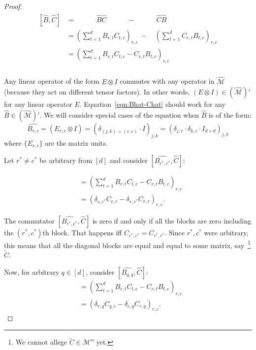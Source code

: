 \begin{proof}
    \begin{align}
        \begin{split}
        \label{eqn:Bhat-Chat}
            [\widehat{B}, \widehat{C}] &= \quad\quad\quad\widehat{B} \widehat{C} \quad\quad\quad -  \quad\quad\quad\widehat{C} \widehat{B} \quad\quad\quad \\
        &= \left(\sum\limits_{t = 1}^d B_{r, t} C_{t,c}\right)_{r,c}  \ - \quad \left(\sum\limits_{t = 1}^d C_{r, t} B_{t,c} \right)_{r,c}\\
        &= \left(\sum\limits_{t = 1}^d B_{r, t} C_{t,c} - C_{r, t} B_{t,c}\right)_{r,c}\\
        \end{split}
    \end{align}

Any linear operator of the form $E \otimes I$ commutes with any operator in $\widehat{\mathcal{M}}$ (because they act on different tensor factors). In other words, $(E \otimes I) \in (\widehat{\mathcal{M}})'$ for any linear operator $E$. Equation~\ref{eqn:Bhat-Chat} should work for any $\widehat{B} \in (\widehat{\mathcal{M}})'$. We will consider special cases of the equation when $\widehat{B}$ is of the form:
\begin{equation}
    \widehat{B_{r,c}} = \left(E_{r,c} \otimes I\right) = \left(\delta_{(j,k) = (r,c)} \cdot I\right)_{j,k} = \left(\delta_{j,r} \cdot \delta_{k, c} \cdot I_{d\times d}\right)_{j,k}
\end{equation}
where $\{E_{r,c}\}$ are the matrix units.


Let $r^* \neq c^*$ be arbitrary from $[d]$ and consider $[\widehat{B_{r^*,c^*}}, \widehat{C}]$:

\begin{align*}
    [\widehat{B_{r^*,c^*}}, \widehat{C}] &= \left(\sum\limits_{t = 1}^d B_{r, t} C_{t,c} - C_{r, t} B_{t,c}\right)_{r,c}\\
    &= \left(\delta_{c,c^*}C_{c,c} - \delta_{r,r^*}C_{r,r}\right)_{r,c}.
\end{align*}

The commutator $[\widehat{B_{r^*,c^*}}, \widehat{C}]$ is zero if and only if all the blocks are zero including the $(r^*, c^*)$th block. That happens iff $C_{c^*, c^*} = C_{r^*, r^*}$. Since $r^*, c^*$ were arbitrary, this means that all the diagonal blocks are equal and equal to some matrix, say~\footnote{We cannot allege $\widetilde{C} \in \mathcal{M}''$ yet.} $\widetilde{C}$.

Now, for arbitrary $q \in [d]$, consider $[\widehat{B_{q,q}}, \widehat{C}]$:
\begin{align*}
    [\widehat{B_{q,q}}, \widehat{C}] &= \left(\sum\limits_{t = 1}^d B_{r, t} C_{t,c} - C_{r, t} B_{t,c}\right)_{r,c}\\
    &= \left(\delta_{r,q} C_{q,c} - \delta_{c,q} C_{r,q} \right)_{r,c}.
\end{align*}


\end{proof}
